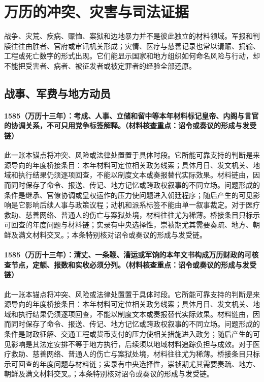 \section{万历的冲突、灾害与司法证据}

战争、灾荒、疾病、赈恤、案狱和边地暴力并不是彼此独立的材料领域。军报和判牍往往由胜者、官府或审讯机关形成；灾情、医疗与慈善记录也常以请赈、捐输、工程或死亡数字的形式出现。它们能显示国家和地方组织如何命名风险与行动，却不能把受害者、病者、被征发者或被定罪者的经验全部还原。

\subsection{战事、军费与地方动员}

\paragraph{1585（万历十三年）：考成、人事、立储和留中等本年材料标记皇帝、内阁与言官的协调关系，不可只用党争标签解释。（材料核查重点：诏令或奏议的形成与发受链）} 此一账本锚点将冲突、风险或法律处置置于具体时段。它所能可靠支持的判断是来源导向的年度桥接条目：本年材料可定位相关政务线索；具体月日、发文机关、地域和执行结果仍须逐项回查，不能以制度文本或奏报替代实际效果。材料链由，因而同时保存了命令、报送、传记、地方记忆或跨政权叙事的不同立场。问题形成的条件是继承、官僚协调或皇权运作的压力使问题进入朝廷程序；随后产生的可见影响是它影响后续人事与政策议程；动机和派系标签不能由单一叙事裁定。对于医疗救助、慈善网络、普通人的伤亡与案狱处境，材料往往尤为稀薄。桥接条目只标示可回查的年度问题与材料链；实录有中央选择性，崇祯期尤其需要奏疏、地方、朝鲜及满文材料交叉。；本条特别核对诏令或奏议的形成与发受链。

\paragraph{1585（万历十三年）：清丈、一条鞭、漕运或军饷的本年文书构成万历财政的可核查节点，定额、报数和实收必须分列。（材料核查重点：诏令或奏议的形成与发受链）} 此一账本锚点将冲突、风险或法律处置置于具体时段。它所能可靠支持的判断是来源导向的年度桥接条目：本年材料可定位相关政务线索；具体月日、发文机关、地域和执行结果仍须逐项回查，不能以制度文本或奏报替代实际效果。材料链由，因而同时保存了命令、报送、传记、地方记忆或跨政权叙事的不同立场。问题形成的条件是财政征解、交通工程或货币支付的压力使相关措施进入政务；随后产生的可见影响是其法定安排不等于地方执行，后续须以地域材料追踪负担与成效。对于医疗救助、慈善网络、普通人的伤亡与案狱处境，材料往往尤为稀薄。桥接条目只标示可回查的年度问题与材料链；实录有中央选择性，崇祯期尤其需要奏疏、地方、朝鲜及满文材料交叉。；本条特别核对诏令或奏议的形成与发受链。

